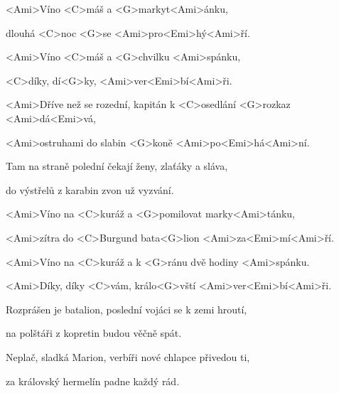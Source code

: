 

<Ami>Víno <C>máš a <G>markyt<Ami>ánku,

dlouhá <C>noc <G>se <Ami>pro<Emi>hý<Ami>ří.

<Ami>Víno <C>máš a <G>chvilku <Ami>spánku,

<C>díky, dí<G>ky, <Ami>ver<Emi>bí<Ami>ři.

\zs
<Ami>Dříve než se rozední,
kapitán k <C>osedlání <G>rozkaz <Ami>dá<Emi>vá,

<Ami>ostruhami do slabin <G>koně <Ami>po<Emi>há<Ami>ní.

Tam na straně polední
čekají ženy, zlaťáky a sláva,

do výstřelů z karabin zvon už vyzvání.
\ks

\zr
<Ami>Víno na <C>kuráž a <G>pomilovat marky<Ami>tánku,

<Ami>zítra do <C>Burgund bata<G>lion 
<Ami>za<Emi>mí<Ami>ří.

<Ami>Víno na <C>kuráž a k <G>ránu dvě hodiny <Ami>spánku.

<Ami>Díky, díky <C>vám, králo<G>vští 
<Ami>ver<Emi>bí<Ami>ři.
\kr

\zs
Rozprášen je batalion,
poslední vojáci se k zemi hroutí,

na polštáři z kopretin budou věčně spát.

Neplač, sladká Marion,
verbíři nové chlapce přivedou ti,

za královský hermelín padne každý rád.
\ks

\zr \kr

\kp
